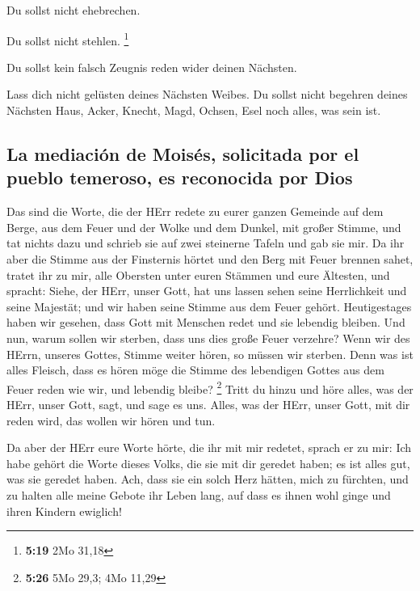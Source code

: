  Du sollst nicht ehebrechen.

 Du sollst nicht stehlen. \footnote{\textbf{5:19} 2Mo
  31,18}

 Du sollst kein falsch Zeugnis reden wider deinen
Nächsten.

 Lass dich nicht gelüsten deines Nächsten Weibes. Du
sollst nicht begehren deines Nächsten Haus, Acker, Knecht, Magd, Ochsen,
Esel noch alles, was sein ist.

\hypertarget{la-mediaciuxf3n-de-moisuxe9s-solicitada-por-el-pueblo-temeroso-es-reconocida-por-dios}{%
\subsection{La mediación de Moisés, solicitada por el pueblo temeroso,
es reconocida por
Dios}\label{la-mediaciuxf3n-de-moisuxe9s-solicitada-por-el-pueblo-temeroso-es-reconocida-por-dios}}

 Das sind die Worte, die der HErr redete zu eurer ganzen
Gemeinde auf dem Berge, aus dem Feuer und der Wolke und dem Dunkel, mit
großer Stimme, und tat nichts dazu und schrieb sie auf zwei steinerne
Tafeln und gab sie mir.  Da ihr aber die Stimme aus der
Finsternis hörtet und den Berg mit Feuer brennen sahet, tratet ihr zu
mir, alle Obersten unter euren Stämmen und eure Ältesten,
 und spracht: Siehe, der HErr, unser Gott, hat uns lassen
sehen seine Herrlichkeit und seine Majestät; und wir haben seine Stimme
aus dem Feuer gehört. Heutigestages haben wir gesehen, dass Gott mit
Menschen redet und sie lebendig bleiben.  Und nun, warum
sollen wir sterben, dass uns dies große Feuer verzehre? Wenn wir des
HErrn, unseres Gottes, Stimme weiter hören, so müssen wir sterben.
 Denn was ist alles Fleisch, dass es hören möge die
Stimme des lebendigen Gottes aus dem Feuer reden wie wir, und lebendig
bleibe? \footnote{\textbf{5:26} 5Mo 29,3; 4Mo 11,29} 
Tritt du hinzu und höre alles, was der HErr, unser Gott, sagt, und sage
es uns. Alles, was der HErr, unser Gott, mit dir reden wird, das wollen
wir hören und tun.

 Da aber der HErr eure Worte hörte, die ihr mit mir
redetet, sprach er zu mir: Ich habe gehört die Worte dieses Volks, die
sie mit dir geredet haben; es ist alles gut, was sie geredet haben.
 Ach, dass sie ein solch Herz hätten, mich zu fürchten,
und zu halten alle meine Gebote ihr Leben lang, auf dass es ihnen wohl
ginge und ihren Kindern ewiglich!

